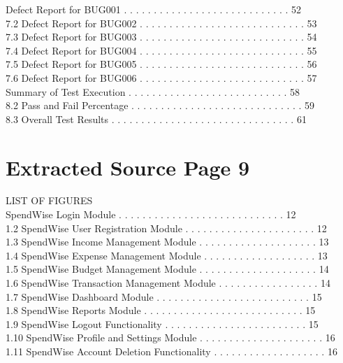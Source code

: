 \documentclass[12pt,a4paper]{report}
\begin{document}
   Defect Report for BUG001 . . . . . . . . . . . . . . . . . . . . . . . . . . . .     52\\ 
7.2   Defect Report for BUG002 . . . . . . . . . . . . . . . . . . . . . . . . . . . .     53\\ 
7.3   Defect Report for BUG003 . . . . . . . . . . . . . . . . . . . . . . . . . . . .     54\\ 
7.4   Defect Report for BUG004 . . . . . . . . . . . . . . . . . . . . . . . . . . . .     55\\ 
7.5   Defect Report for BUG005 . . . . . . . . . . . . . . . . . . . . . . . . . . . .     56\\ 
7.6   Defect Report for BUG006 . . . . . . . . . . . . . . . . . . . . . . . . . . . .     57\\ 

   Summary of Test Execution . . . . . . . . . . . . . . . . . . . . . . . . . . .      58\\ 
8.2   Pass and Fail Percentage . . . . . . . . . . . . . . . . . . . . . . . . . . . . .   59\\ 
8.3   Overall Test Results . . . . . . . . . . . . . . . . . . . . . . . . . . . . . . .   61\\ 

\clearpage
\section*{Extracted Source Page 9}
LIST OF FIGURES\\ 

 SpendWise Login Module . . . . . . . . . . . . . . . . . . . . . . . . . . . .       12\\ 
1.2 SpendWise User Registration Module . . . . . . . . . . . . . . . . . . . . . .       12\\ 
1.3 SpendWise Income Management Module . . . . . . . . . . . . . . . . . . . .           13\\ 
1.4 SpendWise Expense Management Module . . . . . . . . . . . . . . . . . . .            13\\ 
1.5 SpendWise Budget Management Module . . . . . . . . . . . . . . . . . . . .           14\\ 
1.6 SpendWise Transaction Management Module . . . . . . . . . . . . . . . . .            14\\ 
1.7 SpendWise Dashboard Module . . . . . . . . . . . . . . . . . . . . . . . . . .       15\\ 
1.8 SpendWise Reports Module . . . . . . . . . . . . . . . . . . . . . . . . . . .       15\\ 
1.9 SpendWise Logout Functionality . . . . . . . . . . . . . . . . . . . . . . . .       15\\ 
1.10 SpendWise Profile and Settings Module . . . . . . . . . . . . . . . . . . . . .     16\\ 
1.11 SpendWise Account Deletion Functionality . . . . . . . . . . . . . . . . . . .      16\\ 
\end{document}
